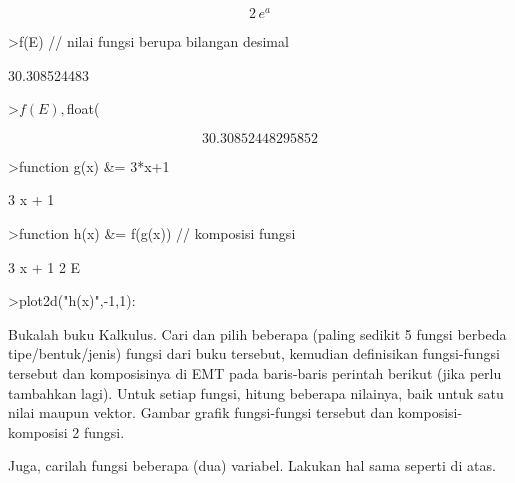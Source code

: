 \documentclass{article}
\begin{document}
\begin{eulernotebook}
\begin{euleroutput}
\end{euleroutput}
\begin{eulerformula}
\[
2\,e^{a}
\]
\end{eulerformula}
\begin{eulerprompt}
>f(E) // nilai fungsi berupa bilangan desimal
\end{eulerprompt}
\begin{euleroutput}
  30.308524483
\end{euleroutput}
\begin{eulerprompt}
>$f(E), $float(%
\end{eulerprompt}
\begin{eulerformula}
\[
30.30852448295852
\]
\end{eulerformula}
\begin{eulerprompt}
>function g(x) &= 3*x+1
\end{eulerprompt}
\begin{euleroutput}
  
                                 3 x + 1
  
\end{euleroutput}
\begin{eulerprompt}
>function h(x) &= f(g(x)) // komposisi fungsi
\end{eulerprompt}
\begin{euleroutput}
  
                                   3 x + 1
                                2 E
  
\end{euleroutput}
\begin{eulerprompt}
>plot2d("h(x)",-1,1):
\end{eulerprompt}
\begin{eulercomment}
Bukalah buku Kalkulus. Cari dan pilih beberapa (paling sedikit 5
fungsi berbeda tipe/bentuk/jenis) fungsi dari buku tersebut, kemudian
definisikan fungsi-fungsi tersebut dan komposisinya di EMT pada
baris-baris perintah berikut (jika perlu tambahkan lagi). Untuk setiap
fungsi, hitung beberapa nilainya, baik untuk satu nilai maupun vektor.
Gambar grafik fungsi-fungsi tersebut dan komposisi-komposisi 2 fungsi.

Juga, carilah fungsi beberapa (dua) variabel. Lakukan hal sama seperti
di atas.


\end{eulercomment}
\end{eulernotebook}
\end{document}
